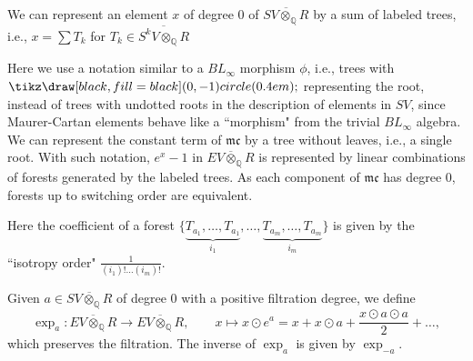 \documentclass[11pt]{amsart}
\numberwithin{equation}{section}
\def\Q{{\mathbb Q}}
\def\mc{{\mathfrak {mc}}}
\begin{document}
We can represent an element $x$ of degree $0$ of $\overline{SV\otimes_{\Q}R}$ by a sum of labeled trees, i.e., $x=\sum T_k$ for $T_k\in \overline{S^kV\otimes_{\Q}R}$
\begin{center}
\end{center}
Here we use a notation similar to a $BL_\infty$ morphism $\phi$, i.e., trees with $\tikz\draw[black,fill=black] (0,-1) circle (0.4em);$ representing the root, instead of trees with undotted roots in the description of elements in $SV$, since Maurer-Cartan elements behave like a ``morphism" from the trivial $BL_\infty$ algebra. We can represent the constant term of $\mathfrak{mc}$ by a tree without leaves, i.e., a single root. With such notation, $e^x-1$ in $\overline{EV\otimes_{\Q}R}$ is represented by linear combinations of forests generated by the labeled trees. As each component of $\mc$ has degree $0$, forests up to switching order are equivalent.
\begin{center}
\end{center}
Here the coefficient of a forest $\{\underbrace{T_{a_1},\ldots,T_{a_1}}_{i_1}, \ldots, \underbrace{T_{a_m},\ldots,T_{a_m}}_{i_m}\}$ is given by the ``isotropy order" $\frac{1}{(i_1)!\ldots (i_m)!}$.


Given $a\in \overline{SV\otimes_{\Q}R}$ of degree $0$ with a positive filtration degree, we define
$$\exp_a:\overline{EV\otimes_{\Q}R}\to \overline{EV\otimes_{\Q}R}, \qquad x\mapsto x\odot e^a=x+x\odot a +\frac{x\odot a \odot a}{2}+\ldots,$$
which preserves the filtration. The inverse of $\exp_a$ is given by $\exp_{-a}$.
\end{document}
